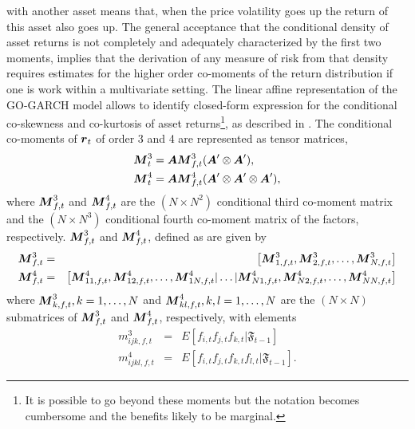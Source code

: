 with another asset means that, when the price volatility goes up the return of
this asset also goes up. The general acceptance that the conditional density of
asset returns is not completely and adequately  characterized by the first two
moments, implies that the derivation of any measure of risk from that density
requires estimates for the higher order co-moments of the return distribution if
one is work within a multivariate setting. The linear affine representation of
the GO-GARCH model allows to identify closed-form expression for the conditional
co-skewness and co-kurtosis of asset returns\footnote{It is possible to go beyond
these moments but the notation becomes cumbersome and the benefits likely to
be marginal.}, as described in \cite{Athayde2000}. The conditional co-moments
of \( \mbox{\boldmath$r$}_t \) of order 3 and 4  are represented as tensor matrices,
\begin{equation}\label{eq:facd6}
\begin{gathered}
  \bfM_{t}^3 = \bfA \bfM_{f,t}^3(\bfA' \otimes \bfA'), \hfill \\
  \bfM_{t}^4 = \bfA \bfM_{f,t}^4(\bfA' \otimes \bfA' \otimes \bfA'), \hfill \\
\end{gathered}
\end{equation}
where \( \mbox{\boldmath$M$}_{f,t}^3\) and \( \mbox{\boldmath$M$}_{f,t}^4 \) are the \( (N \times N^2) \)
conditional third co-moment matrix and the \( (N \times N^3) \) conditional
fourth co-moment matrix of the factors, respectively. \( \mbox{\boldmath$M$}_{f,t}^3 \)
and \( \mbox{\boldmath$M$}_{f,t}^4\), defined as are given by
\begin{eqnarray}
\mbox{\boldmath$M$}_{f,t}^3 & =&
\begin{bmatrix}
\mbox{\boldmath$M$}_{1,f,t}^3,\mbox{\boldmath$M$}_{2,f,t}^3,\ldots,\mbox{\boldmath$M$}_{N,f,t}^3
\end{bmatrix} \label{eq:comoment_factor_matrix_3}\\
\mbox{\boldmath$M$}_{f,t}^4 & = &
\begin{bmatrix}
\mbox{\boldmath$M$}_{11,f,t}^4,\mbox{\boldmath$M$}_{12,f,t}^4,\ldots,\mbox{\boldmath$M$}_{1N,f,t}^4|\ldots|\mbox{\boldmath$M$}_{N1,f,t}^4,\mbox{\boldmath$M$}_{N2,f,t}^4,\ldots,\mbox{\boldmath$M$}_{NN,f,t}^4
\end{bmatrix}\label{eq:comoment_factor_matrix_4}
\end{eqnarray}
where \( \mbox{\boldmath$M$}_{k,f,t}^3, k=1,\ldots,N \) and \( \mbox{\boldmath$M$}_{kl,f,t}^4, k,l=1,\ldots,N \)
are the \((N\times N)\) submatrices of \( \mbox{\boldmath$M$}_{f,t}^3 \) and \( \mbox{\boldmath$M$}_{f,t}^4\),
respectively, with elements
\begin{eqnarray*}
m_{ijk,f,t}^3 & = & E[f_{i,t}f_{j,t}f_{k,t}|\mathfrak{F}_{t-1}] \\
m_{ijkl,f,t}^4 & = & E[f_{i,t}f_{j,t}f_{k,t}f_{l,t}|\mathfrak{F}_{t-1}].
\end{eqnarray*}
